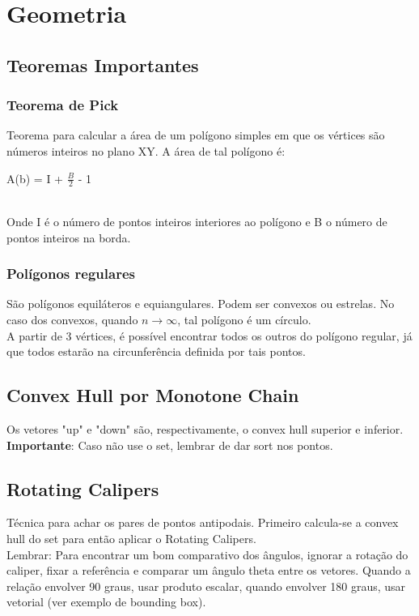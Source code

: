 \section{Geometria}

\subsection{Teoremas Importantes}

\subsubsection{Teorema de Pick}
Teorema para calcular a \'{a}rea de um pol\'{i}gono simples em que os v\'{e}rtices são n\'{u}meros inteiros no plano XY. A \'{a}rea de tal pol\'{i}gono é: 
\\\centerline{A(b) = I + $\frac{B}{2}$ - 1}
\\Onde I \'{e} o n\'{u}mero de pontos inteiros interiores ao pol\'{i}gono e B o n\'{u}mero de pontos inteiros na borda.
\divisor
\subsubsection{Pol\'{i}gonos regulares}
S\~{a}o pol\'{i}gonos equil\'{a}teros e equiangulares. Podem ser convexos ou estrelas. No caso dos convexos, quando $n\rightarrow\infty$, tal pol\'{i}gono \'{e} um c\'{i}rculo.
\\ A partir de 3 v\'{e}rtices, \'{e} poss\'{i}vel encontrar todos os outros do pol\'{i}gono regular, j\'{a} que todos estar\~{a}o na circunfer\^{e}ncia definida por tais pontos. 
\divisor

\subsection{Convex Hull por Monotone Chain}
Os vetores "up" e "down" s\~{a}o, respectivamente, o convex hull superior e inferior.
\\ \textbf{Importante}: Caso n\~{a}o use o set, lembrar de dar sort nos pontos.
\divisor


\subsection{Rotating Calipers}

T\'{e}cnica para achar os pares de pontos antipodais. Primeiro calcula-se a convex hull do set para ent\~{a}o aplicar o Rotating Calipers.
\\ Lembrar: Para encontrar um bom comparativo dos \^{a}ngulos, ignorar a rota\c{c}\~{a}o do caliper, fixar a refer\^{e}ncia e comparar um \^{a}ngulo theta entre os vetores. Quando a rela\c{c}\~{a}o envolver 90 graus, usar produto escalar, quando envolver 180 graus, usar vetorial (ver exemplo de bounding box).


